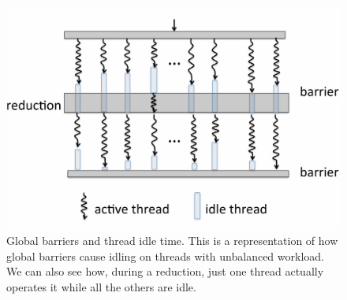 \begin{figure}[t]
 	\begin{center}
 		\includegraphics[scale=0.09]{Figures/globalBarriersAndThreadIdleTime.png}
 		\caption{Global barriers and thread idle time\protect\cite{grubel2016dynamic}.
 		This is a representation of how global barriers cause idling on threads with unbalanced workload.
 		We can also see how, during a reduction, just one thread actually operates it while all the others are idle.}
 		\label{fig:globalBarriers}
 	\end{center}
\end{figure}

